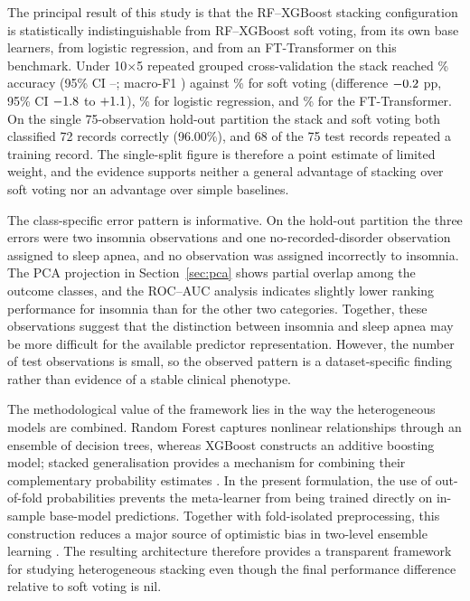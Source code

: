 \documentclass[a4paper,fleqn]{cas-dc}
\begin{document}
The principal result of this study is that the RF--XGBoost stacking configuration is statistically indistinguishable from RF--XGBoost soft voting, from its own base learners, from logistic regression, and from an FT-Transformer on this benchmark. Under 10$\times$5 repeated grouped cross-validation the stack reached \AccStackG\% accuracy (95\% CI \CIloStackG--\CIhiStackG; macro-F1 \FStackG) against \AccVoteG\% for soft voting (difference $-0.2$ pp, 95\% CI $-1.8$ to $+1.1$), \AccLRG\% for logistic regression, and \AccFTTG\% for the FT-Transformer. On the single 75-observation hold-out partition the stack and soft voting both classified 72 records correctly (96.00\%), and 68 of the 75 test records repeated a training record. The single-split figure is therefore a point estimate of limited weight, and the evidence supports neither a general advantage of stacking over soft voting nor an advantage over simple baselines.

The class-specific error pattern is informative. On the hold-out partition the three errors were two insomnia observations and one no-recorded-disorder observation assigned to sleep apnea, and no observation was assigned incorrectly to insomnia. The PCA projection in Section~\ref{sec:pca} shows partial overlap among the outcome classes, and the ROC--AUC analysis indicates slightly lower ranking performance for insomnia than for the other two categories. Together, these observations suggest that the distinction between insomnia and sleep apnea may be more difficult for the available predictor representation. However, the number of test observations is small, so the observed pattern is a dataset-specific finding rather than evidence of a stable clinical phenotype.

The methodological value of the framework lies in the way the heterogeneous models are combined. Random Forest captures nonlinear relationships through an ensemble of decision trees, whereas XGBoost constructs an additive boosting model; stacked generalisation provides a mechanism for combining their complementary probability estimates \cite{wolpert1992}. In the present formulation, the use of out-of-fold probabilities prevents the meta-learner from being trained directly on in-sample base-model predictions. Together with fold-isolated preprocessing, this construction reduces a major source of optimistic bias in two-level ensemble learning \cite{kapoor2023}. The resulting architecture therefore provides a transparent framework for studying heterogeneous stacking even though the final performance difference relative to soft voting is nil.
\end{document}
